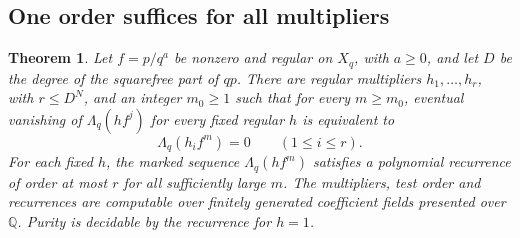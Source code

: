 \documentclass[11pt]{article}
\newtheorem{theorem}{Theorem}
\newcommand{\Lq}{\Lambda_q}
\begin{document}
\subsection*{One order suffices for all multipliers}

\begin{theorem}\label{thm:all-multipliers}
Let \(f=p/q^a\) be nonzero and regular on \(X_q\), with \(a\ge0\), and let \(D\)
be the degree of the squarefree part of \(qp\). There are regular
multipliers \(h_1,\ldots,h_r\), with \(r\le D^N\), and an integer
\(m_0\ge1\) such that for every \(m\ge m_0\),
eventual vanishing of \(\Lq(hf^j)\) for every fixed regular \(h\)
is equivalent to
\[
                         \Lq(h_i f^m)=0\qquad(1\le i\le r).
\]
For each fixed \(h\), the marked sequence \(\Lq(h f^m)\) satisfies a
polynomial recurrence of order at most \(r\) for all sufficiently
large \(m\). The multipliers, test order and recurrences are computable
over finitely generated coefficient fields presented over \(\mathbb Q\).
Purity is decidable by the recurrence for \(h=1\).
\end{theorem}
\end{document}
